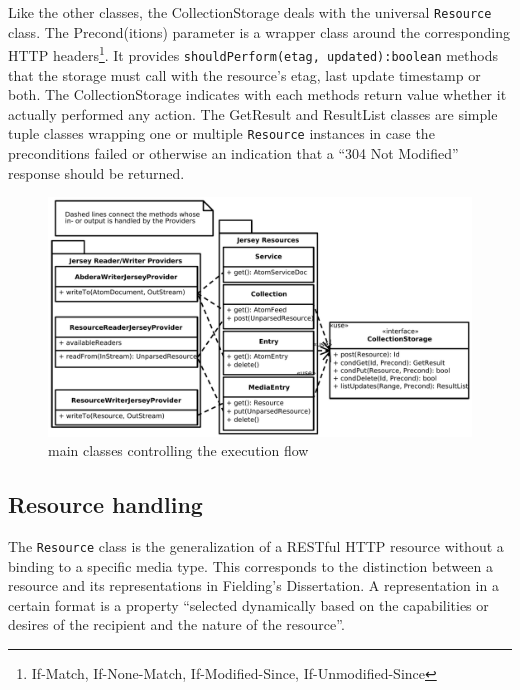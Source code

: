 \documentclass[11pt,a4paper,headsepline,twoside]{scrartcl}		%
\begin{document}
Like the other classes, the CollectionStorage deals with the universal
\lstinline:Resource: class. The Precond(itions) parameter is a wrapper class
around the corresponding HTTP headers\footnote{If-Match, If-None-Match,
  If-Modified-Since, If-Unmodified-Since}. It provides
\lstinline;shouldPerform(etag, updated):boolean; methods that the storage must
call with the resource's etag, last update timestamp or both. The
CollectionStorage indicates with each methods return value whether it actually
performed any action. The GetResult and ResultList classes are simple tuple
classes wrapping one or multiple \lstinline:Resource: instances in case the
preconditions failed or otherwise an indication that a ``304 Not Modified''
response should be returned.

\begin{figure}[htb]
  \advance\leftskip-1cm
  \includegraphics[width=1.2\textwidth]{executionflowoverview}

  \caption{main classes controlling the execution flow}
  \label{fig:executionflowoverview}
\end{figure}

\subsection{Resource handling}
\label{sec:resource-handling}

The \lstinline:Resource: class is the generalization of a RESTful HTTP resource
without a binding to a specific media type. This corresponds to the distinction
between a resource and its representations in Fielding's
Dissertation\cite[sec. 5.2.1.1]{Fielding2000}. A representation in a certain
format is a property ``selected dynamically based on the capabilities or desires of
the recipient and the nature of the
resource''\cite[p. 87]{Fielding2000}.
\end{document}
